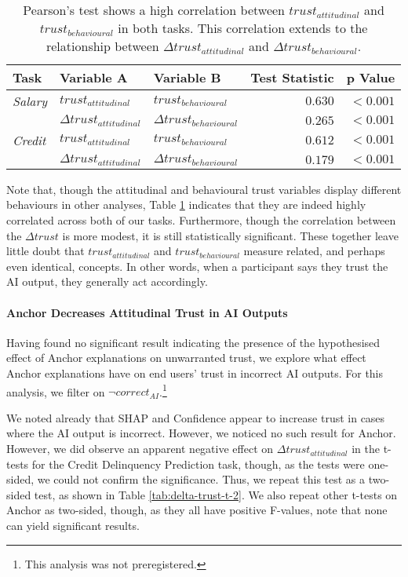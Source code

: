 \begin{table}[htb]
    \centering
    \caption{Pearson's test shows a high correlation between $trust_{attitudinal}$ and $trust_{behavioural}$ in both tasks. This correlation extends to the relationship between $\Delta trust_{attitudinal}$ and $\Delta trust_{behavioural}$.}
    \label{tab:trust-correlation}
    \begin{tabular}{lllrr}
        \toprule
        Task & Variable A & Variable B & Test Statistic & p Value \\
        \midrule
        \emph{Salary} & $trust_{attitudinal}$ & $trust_{behavioural}$ & $\mathbf{0.630}$ & $\mathbf{<0.001}$ \\
        & $\Delta trust_{attitudinal}$ & $\Delta trust_{behavioural}$ & $\mathbf{0.265}$ & $\mathbf{<0.001}$ \\
        \midrule
        \emph{Credit} & $trust_{attitudinal}$ & $trust_{behavioural}$ & $\mathbf{0.612}$ & $\mathbf{<0.001}$ \\
        & $\Delta trust_{attitudinal}$ & $\Delta trust_{behavioural}$ & $\mathbf{0.179}$ & $\mathbf{<0.001}$ \\
        \bottomrule
    \end{tabular}
\end{table}

Note that, though the attitudinal and behavioural trust variables display different behaviours in other analyses, Table \ref{tab:trust-correlation} indicates that they are indeed highly correlated across both of our tasks. Furthermore, though the correlation between the $\Delta trust$ is more modest, it is still statistically significant. These together leave little doubt that $trust_{attitudinal}$ and $trust_{behavioural}$ measure related, and perhaps even identical, concepts. In other words, when a participant says they trust the AI output, they generally act accordingly.

\paragraph{Anchor Decreases Attitudinal Trust in AI Outputs}\label{sec:anchor-attitudinal}
Having found no significant result indicating the presence of the hypothesised effect of Anchor explanations on unwarranted trust, we explore what effect Anchor explanations have on end users' trust in incorrect AI outputs. For this analysis, we filter on $\neg correct_{AI}$.\footnote{This analysis was not preregistered.}

We noted already that SHAP and Confidence appear to increase trust in cases where the AI output is incorrect. However, we noticed no such result for Anchor. However, we did observe an apparent negative effect on $\Delta trust_{attitudinal}$ in the t-tests for the Credit Delinquency Prediction task, though, as the tests were one-sided, we could not confirm the significance. Thus, we repeat this test as a two-sided test, as shown in Table \ref{tab:delta-trust-t-2}. We also repeat other t-tests on Anchor as two-sided, though, as they all have positive F-values, note that none can yield significant results.

